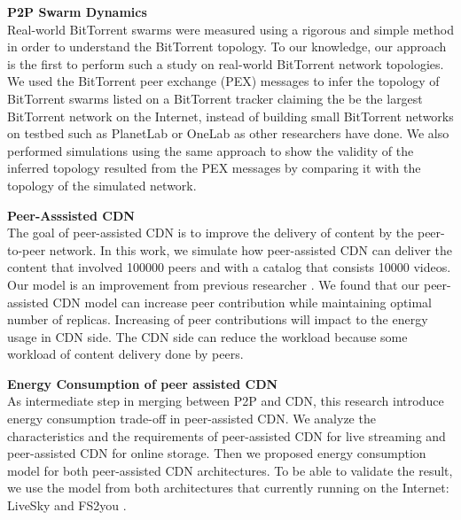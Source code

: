 \textbf{P2P Swarm Dynamics}\\
Real-world BitTorrent swarms were measured using a rigorous and simple method in order to understand the BitTorrent topology. 
To our knowledge, our approach is the first to perform such a study on real-world BitTorrent network topologies. 
We used the BitTorrent peer exchange (PEX) messages to infer the topology of BitTorrent swarms listed on a BitTorrent tracker claiming the be the largest BitTorrent network on the Internet, instead of building small BitTorrent networks on testbed such as PlanetLab or OneLab as other researchers have done\cite{dale2008evolution}.
We also performed simulations using the same approach to show the validity of the inferred topology resulted from the PEX messages by comparing it with the topology of the simulated network.

\textbf{Peer-Asssisted CDN}\\
The goal of peer-assisted CDN is to improve the delivery of content by the peer-to-peer network.  
In this work, we simulate how peer-assisted CDN can deliver the content that involved 100000 peers and with a catalog that consists 10000 videos.
Our model is an improvement from previous researcher \cite{1613869}.
We found that our peer-assisted CDN model can increase peer contribution while maintaining optimal number of replicas.
Increasing of peer contributions will impact to the energy usage in CDN side. 
The CDN side can reduce the workload because some workload of content delivery done by peers.


\textbf{Energy Consumption of peer assisted CDN}\\
As intermediate step in merging between P2P and CDN, this research introduce energy consumption trade-off in peer-assisted CDN. 
We analyze the characteristics and the requirements of peer-assisted CDN for live streaming and peer-assisted CDN for online storage.
Then we proposed energy consumption model for both peer-assisted CDN architectures.
To be able to validate the result, we use the model from both architectures that currently running on the Internet: LiveSky \cite{Yin:2010:LEC:1823746.1823750} and FS2you \cite{fs2you}.
 



